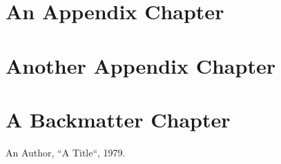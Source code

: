 \documentclass[a4paper,11pt,oneside,showtrims]{alpenthesis}
\begin{document}
\lipsum[2]

\appendix{}
\chapter{An Appendix Chapter}
\lipsum[1-3]

\chapter{Another Appendix Chapter}
\lipsum[4-6]

\backmatter
\chapter{A Backmatter Chapter}
\lipsum[7-9]

\begin{thebibliography}{1}
        An Author, ``A Title``, 1979.
\end{thebibliography}
\end{document}
